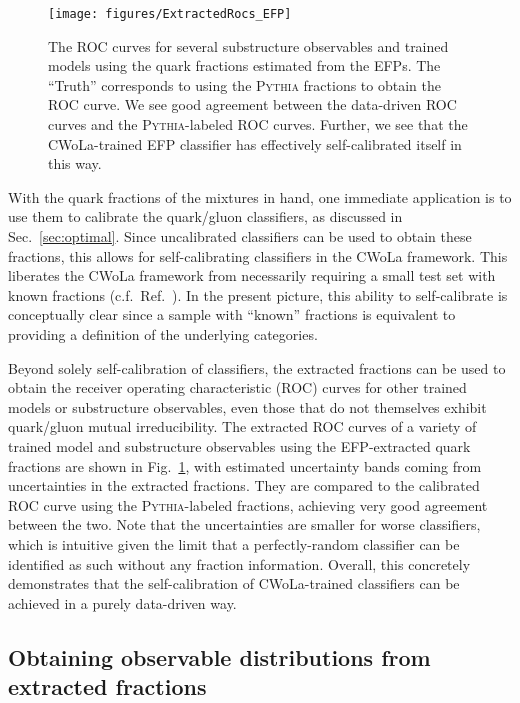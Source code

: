 \documentclass[letterpaper,11pt]{article}
\DeclareRobustCommand{\Sec}[1]{Sec.~\ref{#1}}
\DeclareRobustCommand{\Fig}[1]{Fig.~\ref{#1}}
\DeclareRobustCommand{\Ref}[1]{Ref.~\cite{#1}}
\newcommand{\pythia}{\textsc{Pythia}\xspace}
\begin{document}
\begin{figure}[t]
\centering
\texttt{[image: figures/ExtractedRocs\_EFP]}
\caption{
%
The ROC curves for several substructure observables and trained models using the quark fractions estimated from the EFPs.
%
The ``Truth'' corresponds to using the \pythia fractions to obtain the ROC curve.
%
We see good agreement between the data-driven ROC curves and the \pythia-labeled ROC curves.
%
Further, we see that the CWoLa-trained EFP classifier has effectively self-calibrated itself in this way.}
\label{fig:extractedrocs}
\end{figure}


With the quark fractions of the mixtures in hand, one immediate application is to use them to calibrate the quark/gluon classifiers, as discussed in \Sec{sec:optimal}.
%
Since uncalibrated classifiers can be used to obtain these fractions, this allows for self-calibrating classifiers in the CWoLa framework.
%
This liberates the CWoLa framework from necessarily requiring a small test set with known fractions (c.f.~\Ref{Metodiev:2017vrx}).
%
In the present picture, this ability to self-calibrate is conceptually clear since a sample with ``known'' fractions is equivalent to providing a definition of the underlying categories.


Beyond solely self-calibration of classifiers, the extracted fractions can be used to obtain the receiver operating characteristic (ROC) curves for other trained models or substructure observables, even those that do not themselves exhibit quark/gluon mutual irreducibility.
%
The extracted ROC curves of a variety of trained model and substructure observables using the EFP-extracted quark fractions are shown in \Fig{fig:extractedrocs}, with estimated uncertainty bands coming from uncertainties in the extracted fractions.
%
They are compared to the calibrated ROC curve using the \pythia-labeled fractions, achieving very good agreement between the two.
%
Note that the uncertainties are smaller for worse classifiers, which is intuitive given the limit that a perfectly-random classifier can be identified as such without any fraction information.
%
Overall, this concretely demonstrates that the self-calibration of CWoLa-trained classifiers can be achieved in a purely data-driven way.


\subsection{Obtaining observable distributions from extracted fractions}
\label{sec:obs}
 
\end{document}
